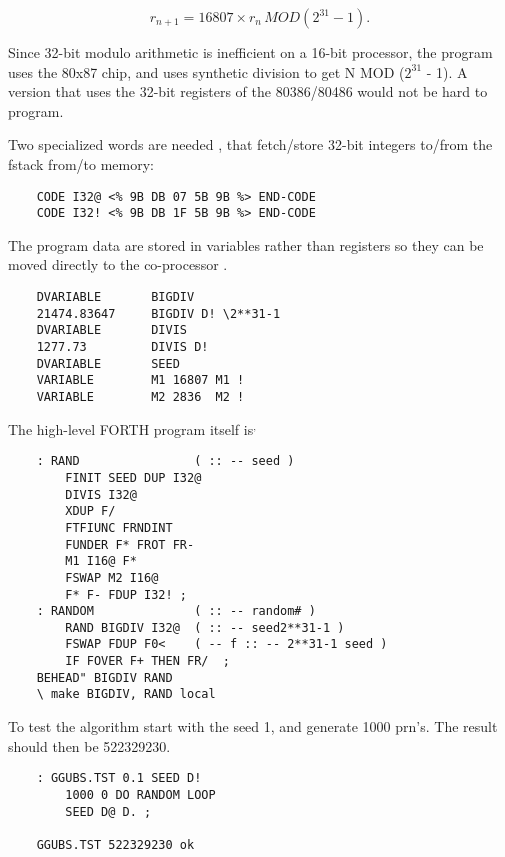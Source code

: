 \begin{equation}
    r_{n+1} = 16807 \times{} r_n \, MOD (2^{31} - 1) .\nonumber
\end{equation}

Since 32-bit modulo arithmetic is inefficient on a 16-bit processor, the
program uses the 80x87 chip, and uses synthetic division
to get N MOD ($2^{31}$ - 1). A version that uses the 32-bit registers
of the 80386/80486 would not be hard to program.

Two specialized words are needed 
, that fetch/store 32-bit integers to/from the fstack from/to memory:

\begin{lstlisting}
    CODE I32@ <% 9B DB 07 5B 9B %> END-CODE
    CODE I32! <% 9B DB 1F 5B 9B %> END-CODE
\end{lstlisting}

The program data are stored in variables rather than registers so
they can be moved directly to the co-processor  .

\begin{lstlisting}
    DVARIABLE       BIGDIV
    21474.83647     BIGDIV D! \2**31-1
    DVARIABLE       DIVIS
    1277.73         DIVIS D!
    DVARIABLE       SEED
    VARIABLE        M1 16807 M1 !
    VARIABLE        M2 2836  M2 !
\end{lstlisting}

The high-level FORTH program itself is$^,$

\begin{lstlisting}
    : RAND                ( :: -- seed )
        FINIT SEED DUP I32@
        DIVIS I32@
        XDUP F/
        FTFIUNC FRNDINT
        FUNDER F* FROT FR-
        M1 I16@ F*
        FSWAP M2 I16@
        F* F- FDUP I32! ;
    : RANDOM              ( :: -- random# )
        RAND BIGDIV I32@  ( :: -- seed2**31-1 )
        FSWAP FDUP F0<    ( -- f :: -- 2**31-1 seed )
        IF FOVER F+ THEN FR/  ;
    BEHEAD" BIGDIV RAND
    \ make BIGDIV, RAND local
\end{lstlisting}
To test the algorithm start with the seed 1, and generate 1000
prn's. The result should then be 522329230.

\begin{lstlisting}
    : GGUBS.TST 0.1 SEED D!
        1000 0 DO RANDOM LOOP
        SEED D@ D. ;

    GGUBS.TST 522329230 ok
\end{lstlisting}

